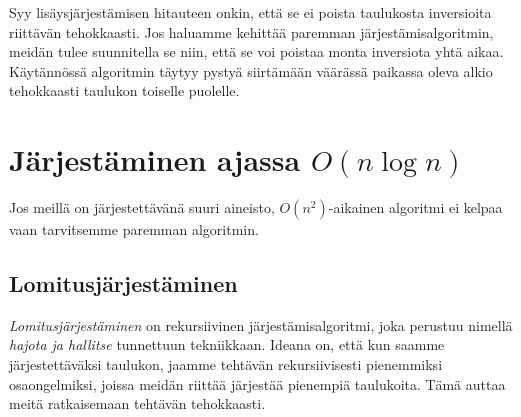 Syy lisäysjärjestämisen hitauteen onkin,
että se ei poista taulukosta inversioita riittävän tehokkaasti.
Jos haluamme kehittää paremman järjestämis\-algoritmin,
meidän tulee suunnitella se niin, että se voi poistaa
monta inversiota yhtä aikaa.
Käytännössä algoritmin täytyy pystyä siirtämään
väärässä paikassa oleva alkio tehokkaasti taulukon
toiselle puolelle.

\section{Järjestäminen ajassa $O(n \log n)$}

Jos meillä on järjestettävänä suuri aineisto,
$O(n^2)$-aikainen algoritmi ei kelpaa vaan tarvitsemme
paremman algoritmin.

\subsection{Lomitusjärjestäminen}

\emph{Lomitusjärjestäminen} on rekursiivinen
järjestämisalgoritmi, joka perustuu nimellä
\emph{hajota ja hallitse} tunnettuun tekniikkaan.
Ideana on, että kun saamme järjestettäväksi taulukon,
jaamme tehtävän rekursiivisesti pienemmiksi osa\-ongelmiksi,
joissa meidän riittää järjestää pienempiä taulukoita.
Tämä auttaa meitä ratkaisemaan tehtävän tehokkaasti.

